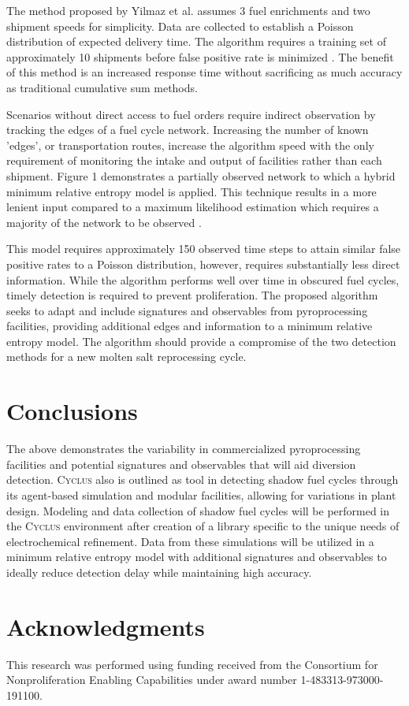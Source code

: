 \documentclass{anstrans}
\newcommand{\Cyclus}{\textsc{Cyclus}\xspace}%
\begin{document}
The method proposed by Yilmaz et al. assumes 3 fuel enrichments and two shipment speeds for simplicity. Data are collected to establish a Poisson distribution of expected delivery time. The algorithm requires a training set of approximately 10 shipments before false positive rate is minimized \cite{Yilmaz_2016}. The benefit of this method is an increased response time without sacrificing as much accuracy as traditional cumulative sum methods. 

Scenarios without direct access to fuel orders require indirect observation by tracking the edges of a fuel cycle network. Increasing the number of known 'edges', or transportation routes, increase the algorithm speed with the only requirement of monitoring the intake and output of facilities rather than each shipment. Figure 1 demonstrates a partially observed network to which a hybrid minimum relative entropy model is applied. This technique results in a more lenient input compared to a maximum likelihood estimation which requires a majority of the network to be observed \cite{Hou_2016}.


This model requires approximately 150 observed time steps to attain similar false positive rates to a Poisson distribution, however, requires substantially less direct information. While the algorithm performs well over time in obscured fuel cycles, timely detection is required to prevent proliferation. The proposed algorithm seeks to adapt and include signatures and observables from pyroprocessing facilities, providing additional edges and information to a minimum relative entropy model. The algorithm should provide a compromise of the two detection methods for a new molten salt reprocessing cycle.

\section{Conclusions}
The above demonstrates the variability in commercialized pyroprocessing facilities and potential signatures and observables that will aid diversion detection. \Cyclus also is outlined as tool in detecting shadow fuel cycles through its agent-based simulation and modular facilities, allowing for variations in plant design. Modeling and data collection of shadow fuel cycles will be performed in the \Cyclus environment after creation of a library specific to the unique needs of electrochemical refinement. Data from these simulations will be utilized in a minimum relative entropy model with additional signatures and observables to ideally reduce detection delay while maintaining high accuracy.

\section{Acknowledgments}
This research was performed using funding received from the Consortium for Nonproliferation Enabling Capabilities under award number 1-483313-973000-191100.



\end{document}
